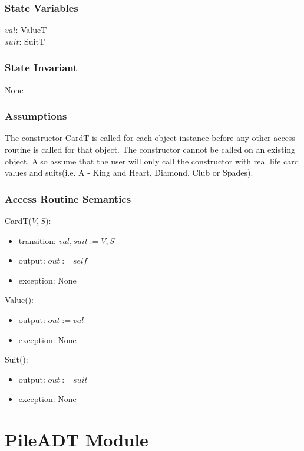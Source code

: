 \documentclass[12pt]{article}
\begin{document}
\subsubsection* {State Variables}

$val$: ValueT\\
$suit$: SuitT

\subsubsection* {State Invariant}

None

\subsubsection* {Assumptions}

The constructor CardT is called for each object instance before any other
access routine is called for that object.  The constructor cannot be called on
an existing object. Also assume that the user will only call the constructor with real life card values and suits(i.e. A - King and Heart, Diamond, Club or Spades).

\subsubsection* {Access Routine Semantics}

CardT($V, S$):
\begin{itemize}
\item transition: $val, suit := V, S$
\item output: $out := \mathit{self}$
\item exception: None
\end{itemize}

\noindent Value():
\begin{itemize}
\item output: $out := val$
\item exception: None
\end{itemize}

\noindent Suit():
\begin{itemize}
\item output: $out := suit$
\item exception: None
\end{itemize}

\newpage

\section* {PileADT Module}
\end{document}
